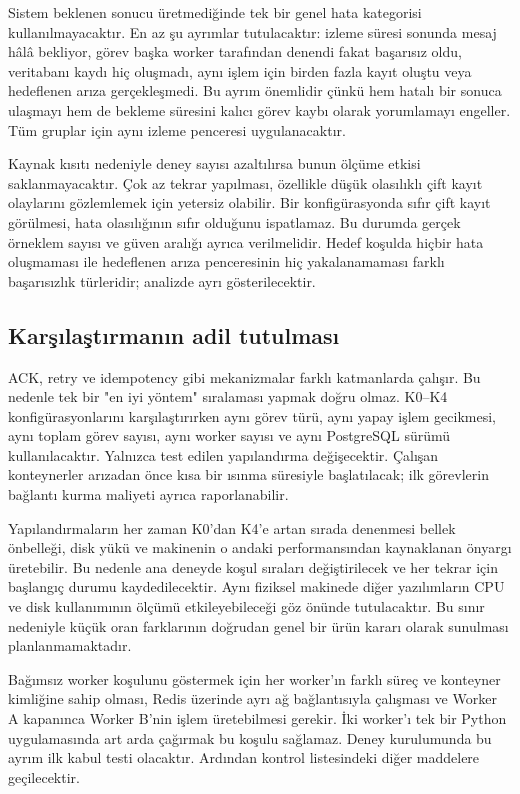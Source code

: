 \documentclass[conference,a4paper]{IEEEtran}
\begin{document}
Sistem beklenen sonucu üretmediğinde tek bir genel hata kategorisi kullanılmayacaktır. En az şu ayrımlar tutulacaktır: izleme süresi sonunda mesaj hâlâ bekliyor, görev başka worker tarafından denendi fakat başarısız oldu, veritabanı kaydı hiç oluşmadı, aynı işlem için birden fazla kayıt oluştu veya hedeflenen arıza gerçekleşmedi. Bu ayrım önemlidir çünkü hem hatalı bir sonuca ulaşmayı hem de bekleme süresini kalıcı görev kaybı olarak yorumlamayı engeller. Tüm gruplar için aynı izleme penceresi uygulanacaktır.

Kaynak kısıtı nedeniyle deney sayısı azaltılırsa bunun ölçüme etkisi saklanmayacaktır. Çok az tekrar yapılması, özellikle düşük olasılıklı çift kayıt olaylarını gözlemlemek için yetersiz olabilir. Bir konfigürasyonda sıfır çift kayıt görülmesi, hata olasılığının sıfır olduğunu ispatlamaz. Bu durumda gerçek örneklem sayısı ve güven aralığı ayrıca verilmelidir. Hedef koşulda hiçbir hata oluşmaması ile hedeflenen arıza penceresinin hiç yakalanamaması farklı başarısızlık türleridir; analizde ayrı gösterilecektir.

\subsection{Karşılaştırmanın adil tutulması}
ACK, retry ve idempotency gibi mekanizmalar farklı katmanlarda çalışır. Bu nedenle tek bir "en iyi yöntem" sıralaması yapmak doğru olmaz. K0--K4 konfigürasyonlarını karşılaştırırken aynı görev türü, aynı yapay işlem gecikmesi, aynı toplam görev sayısı, aynı worker sayısı ve aynı PostgreSQL sürümü kullanılacaktır. Yalnızca test edilen yapılandırma değişecektir. Çalışan konteynerler arızadan önce kısa bir ısınma süresiyle başlatılacak; ilk görevlerin bağlantı kurma maliyeti ayrıca raporlanabilir.

Yapılandırmaların her zaman K0'dan K4'e artan sırada denenmesi bellek önbelleği, disk yükü ve makinenin o andaki performansından kaynaklanan önyargı üretebilir. Bu nedenle ana deneyde koşul sıraları değiştirilecek ve her tekrar için başlangıç durumu kaydedilecektir. Aynı fiziksel makinede diğer yazılımların CPU ve disk kullanımının ölçümü etkileyebileceği göz önünde tutulacaktır. Bu sınır nedeniyle küçük oran farklarının doğrudan genel bir ürün kararı olarak sunulması planlanmamaktadır.

Bağımsız worker koşulunu göstermek için her worker'ın farklı süreç ve konteyner kimliğine sahip olması, Redis üzerinde ayrı ağ bağlantısıyla çalışması ve Worker A kapanınca Worker B'nin işlem üretebilmesi gerekir. İki worker'ı tek bir Python uygulamasında art arda çağırmak bu koşulu sağlamaz. Deney kurulumunda bu ayrım ilk kabul testi olacaktır. Ardından kontrol listesindeki diğer maddelere geçilecektir.
\end{document}
